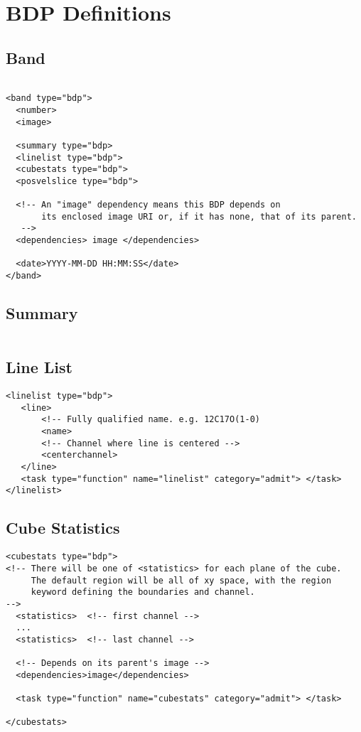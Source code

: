 \documentclass{article}
\begin{document}
\appendix
\section{BDP Definitions}

\subsection{Band}
\footnotesize
\begin{verbatim}

<band type="bdp">
  <number>
  <image>

  <summary type="bdp>
  <linelist type="bdp">
  <cubestats type="bdp">
  <posvelslice type="bdp">

  <!-- An "image" dependency means this BDP depends on 
       its enclosed image URI or, if it has none, that of its parent.
   -->
  <dependencies> image </dependencies>

  <date>YYYY-MM-DD HH:MM:SS</date>
</band>

\end{verbatim}

\subsection{Summary}
\footnotesize
\begin{verbatim}
\end{verbatim}

\subsection{Line List}
\footnotesize
\begin{verbatim}
<linelist type="bdp">
   <line>
       <!-- Fully qualified name. e.g. 12C17O(1-0)
       <name>
       <!-- Channel where line is centered -->
       <centerchannel>
   </line>
   <task type="function" name="linelist" category="admit"> </task>
</linelist>

\end{verbatim}

\subsection{Cube Statistics}
\footnotesize
\begin{verbatim}
<cubestats type="bdp">
<!-- There will be one of <statistics> for each plane of the cube. 
     The default region will be all of xy space, with the region 
     keyword defining the boundaries and channel. 
-->
  <statistics>  <!-- first channel -->
  ...
  <statistics>  <!-- last channel -->

  <!-- Depends on its parent's image -->
  <dependencies>image</dependencies>

  <task type="function" name="cubestats" category="admit"> </task>

</cubestats>
\end{verbatim}
\end{document}
